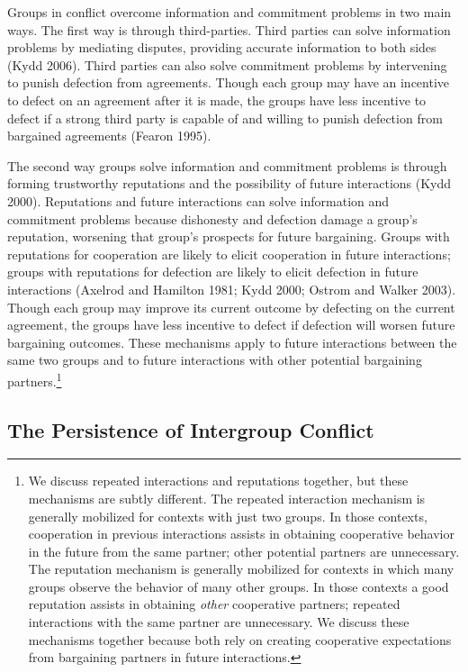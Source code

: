 \documentclass[11pt]{article}
\begin{document}
Groups in conflict overcome information and commitment problems in two
main ways. The first way is through third-parties. Third parties can
solve information problems by mediating disputes, providing accurate
information to both sides (Kydd 2006). Third parties can also solve
commitment problems by intervening to punish defection from agreements.
Though each group may have an incentive to defect on an agreement after
it is made, the groups have less incentive to defect if a strong third
party is capable of and willing to punish defection from bargained
agreements (Fearon 1995).

The second way groups solve information and commitment problems is
through forming trustworthy reputations and the possibility of future
interactions (Kydd 2000). Reputations and future interactions can solve
information and commitment problems because dishonesty and defection
damage a group's reputation, worsening that group's prospects for future
bargaining. Groups with reputations for cooperation are likely to elicit
cooperation in future interactions; groups with reputations for
defection are likely to elicit defection in future interactions (Axelrod
and Hamilton 1981; Kydd 2000; Ostrom and Walker 2003). Though each group
may improve its current outcome by defecting on the current agreement,
the groups have less incentive to defect if defection will worsen future
bargaining outcomes. These mechanisms apply to future interactions
between the same two groups and to future interactions with other
potential bargaining partners.\footnote{We discuss repeated interactions
  and reputations together, but these mechanisms are subtly different.
  The repeated interaction mechanism is generally mobilized for contexts
  with just two groups. In those contexts, cooperation in previous
  interactions assists in obtaining cooperative behavior in the future
  from the same partner; other potential partners are unnecessary. The
  reputation mechanism is generally mobilized for contexts in which many
  groups observe the behavior of many other groups. In those contexts a
  good reputation assists in obtaining \emph{other} cooperative
  partners; repeated interactions with the same partner are unnecessary.
  We discuss these mechanisms together because both rely on creating
  cooperative expectations from bargaining partners in future
  interactions.}

\hypertarget{the-persistence-of-intergroup-conflict}{%
\subsection{The Persistence of Intergroup
Conflict}\label{the-persistence-of-intergroup-conflict}}
\end{document}
